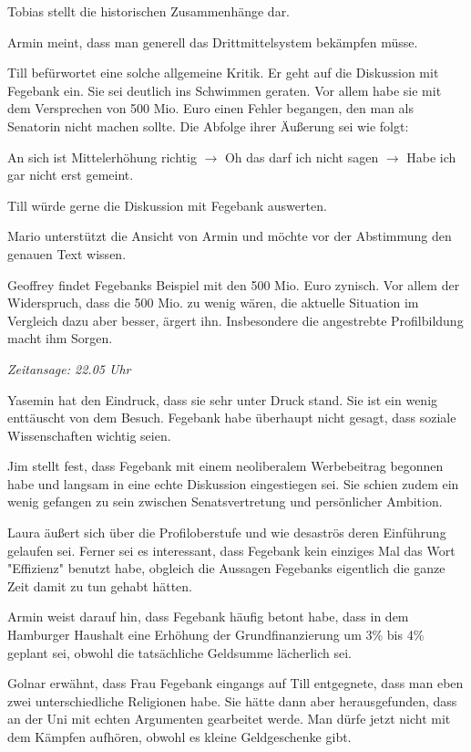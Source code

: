 \documentclass[ngerman,headheight=70pt]{scrartcl}
\begin{document}
    Tobias stellt die historischen Zusammenhänge dar.

    Armin meint, dass man generell das Drittmittelsystem bekämpfen müsse.

    Till befürwortet eine solche allgemeine Kritik. Er geht auf die Diskussion
    mit Fegebank ein. Sie sei deutlich ins Schwimmen geraten. Vor allem
    habe sie mit dem Versprechen von 500 Mio. Euro einen Fehler begangen, den
    man als Senatorin nicht machen sollte. Die Abfolge ihrer Äußerung sei wie folgt:

    An sich ist Mittelerhöhung richtig \(\rightarrow\) Oh das darf ich nicht
    sagen \(\rightarrow\) Habe ich gar nicht erst gemeint.

    Till würde gerne die Diskussion mit Fegebank auswerten.

    Mario unterstützt die Ansicht von Armin und möchte vor der Abstimmung den
    genauen Text wissen.

    Geoffrey findet Fegebanks Beispiel mit den 500 Mio. Euro zynisch. Vor allem
    der Widerspruch, dass die 500 Mio. zu wenig wären, die aktuelle Situation
    im Vergleich dazu aber besser, ärgert ihn. Insbesondere die angestrebte
    Profilbildung macht ihm Sorgen.

    \textit{Zeitansage: 22.05 Uhr}

    Yasemin hat den Eindruck, dass sie sehr unter Druck stand. Sie ist ein
    wenig enttäuscht von dem Besuch. Fegebank habe überhaupt nicht
    gesagt, dass soziale Wissenschaften wichtig seien.

    Jim stellt fest, dass Fegebank mit einem neoliberalem Werbebeitrag
    begonnen habe und langsam in eine echte Diskussion eingestiegen sei.
    Sie schien zudem ein wenig gefangen zu sein zwischen Senatsvertretung und
    persönlicher Ambition.

    Laura äußert sich über die Profiloberstufe und wie desaströs deren Einführung
    gelaufen sei. Ferner sei es interessant, dass Fegebank kein einziges Mal das
    Wort "Effizienz" benutzt habe, obgleich die Aussagen Fegebanks eigentlich
    die ganze Zeit damit zu tun gehabt hätten.

    Armin weist darauf hin, dass Fegebank häufig betont habe, dass in dem Hamburger
    Haushalt eine Erhöhung der Grundfinanzierung um 3\% bis 4\% geplant sei, obwohl
    die tatsächliche Geldsumme lächerlich sei.

    Golnar erwähnt, dass Frau Fegebank eingangs auf Till entgegnete, dass man eben
    zwei unterschiedliche Religionen habe. Sie hätte dann aber herausgefunden,
    dass an der Uni mit echten Argumenten gearbeitet werde. Man dürfe jetzt nicht
    mit dem Kämpfen aufhören, obwohl es kleine Geldgeschenke gibt.
\end{document}
